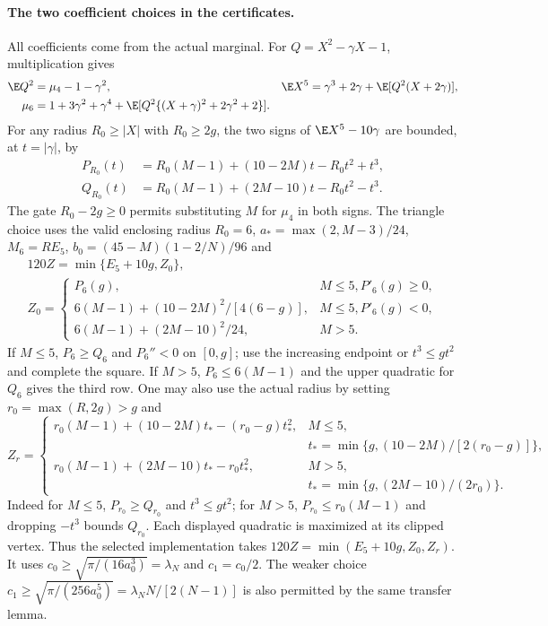 \paragraph{The two coefficient choices in the certificates.}
All coefficients come from the actual marginal. For $Q=X^2-\gamma X-1$,
multiplication gives
\begin{align}\label{j:local:fourier:pearson}
 \E Q^2&=\mu_4-1-\gamma^2,&
 \E X^5&=\gamma^3+2\gamma+\E[Q^2(X+2\gamma)],\notag\\
 \mu_6&=1+3\gamma^2+\gamma^4+
       \E[Q^2\{(X+\gamma)^2+2\gamma^2+2\}].
\end{align}
For any radius $R_0\ge|X|$ with $R_0\ge2g$, the two signs of
$\E X^5-10\gamma$ are bounded, at $t=|\gamma|$, by
\begin{align*}
 P_{R_0}(t)&=R_0(M-1)+(10-2M)t-R_0t^2+t^3,\\
 Q_{R_0}(t)&=R_0(M-1)+(2M-10)t-R_0t^2-t^3.
\end{align*}
The gate $R_0-2g\ge0$ permits substituting $M$ for $\mu_4$ in both
signs. The triangle choice uses the valid enclosing radius $R_0=6$, $a_* =\max(2,M-3)/24$,
$M_6=RE_5$, $b_0=(45-M)(1-2/N)/96$ and
\begin{equation}\label{j:local:fourier:z0}
\begin{gathered}
 120Z=\min\{E_5+10g,Z_0\},\\
 Z_0=\begin{cases}
 P_6(g),&M\le5, P'_6(g)\ge0,\\
 6(M-1)+(10-2M)^2/[4(6-g)],&M\le5, P'_6(g)<0,\\
 6(M-1)+(2M-10)^2/24,&M>5.
 \end{cases}
\end{gathered}
\end{equation}
If $M\le5$, $P_6\ge Q_6$ and $P_6''<0$ on $[0,g]$; use the
increasing endpoint or $t^3\le gt^2$ and complete the square.
If $M>5$, $P_6\le6(M-1)$ and the upper quadratic for $Q_6$ gives
the third row. One may also use the actual radius by setting
$r_0=\max(R,2g)>g$ and
\[
 Z_r=\begin{cases}
 r_0(M-1)+(10-2M)t_*-(r_0-g)t_*^2,
 & M\le5,\\
 & t_*=\min\{g,(10-2M)/[2(r_0-g)]\},\\
 r_0(M-1)+(2M-10)t_*-r_0t_*^2,
 & M>5,\\
 & t_*=\min\{g,(2M-10)/(2r_0)\}.
 \end{cases}
\]
Indeed for $M\le5$, $P_{r_0}\ge Q_{r_0}$ and $t^3\le gt^2$;
for $M>5$, $P_{r_0}\le r_0(M-1)$ and dropping $-t^3$ bounds
$Q_{r_0}$. Each displayed quadratic is maximized at its clipped vertex.
Thus the selected implementation takes
$120Z=\min(E_5+10g,Z_0,Z_r)$.
It uses $c_0\ge\sqrt{\pi/(16a_0^3)}=\lambda_N$ and $c_1=c_0/2$.
The weaker choice $c_1\ge\sqrt{\pi/(256a_0^5)}
=\lambda_N N/[2(N-1)]$ is also permitted by the same transfer lemma.

